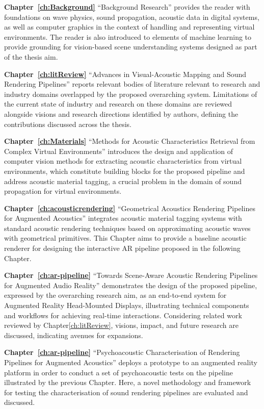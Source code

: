 \textbf{Chapter~\ref{ch:Background}} ``Background Research'' provides the reader with foundations on wave physics, sound propagation, acoustic data in digital systems, as well as computer graphics in the context of handling and representing virtual environments. The reader is also introduced to elements of machine learning to provide grounding for vision-based scene understanding systems designed as part of the thesis aim.

\textbf{Chapter~\ref{ch:litReview}} ``Advances in Visual-Acoustic Mapping and Sound Rendering Pipelines'' reports relevant bodies of literature relevant to research and industry domains overlapped by the proposed overarching system. Limitations of the current state of industry and research on these domains are reviewed alongside visions and research directions identified by authors, defining the contributions discussed across the thesis.

\textbf{Chapter~\ref{ch:Materials}} ``Methods for Acoustic Characteristics Retrieval from Complex Virtual Environments'' introduces the design and application of computer vision methods for extracting acoustic characteristics from virtual environments, which constitute building blocks for the proposed pipeline and address acoustic material tagging, a crucial problem in the domain of sound propagation for virtual environments.

\textbf{Chapter~\ref{ch:acousticrendering}} ``Geometrical Acoustics Rendering Pipelines for Augmented Acoustics'' integrates acoustic material tagging systems with standard acoustic rendering techniques based on approximating acoustic waves with geometrical primitives. This Chapter aims to provide a baseline acoustic renderer for designing the interactive AR pipeline proposed in the following Chapter.

\textbf{Chapter~\ref{ch:ar-pipeline}} ``Towards Scene-Aware Acoustic Rendering Pipelines for Augmented Audio Reality'' demonstrates the design of the proposed pipeline, expressed by the overarching research aim, as an end-to-end system for Augmented Reality Head-Mounted Displays, illustrating technical components and workflows for achieving real-time interactions. Considering related work reviewed by Chapter\ref{ch:litReview}, visions, impact, and future research are discussed, indicating avenues for expansions.

\textbf{Chapter~\ref{ch:ar-pipeline}} ``Psychoacoustic Characterisation of Rendering Pipelines for Augmented Acoustics'' deploys a prototype to an augmented reality platform in order to conduct a set of psychoacoustic tests on the pipeline illustrated by the previous Chapter. Here, a novel methodology and framework for testing the characterisation of sound rendering pipelines are evaluated and discussed.

